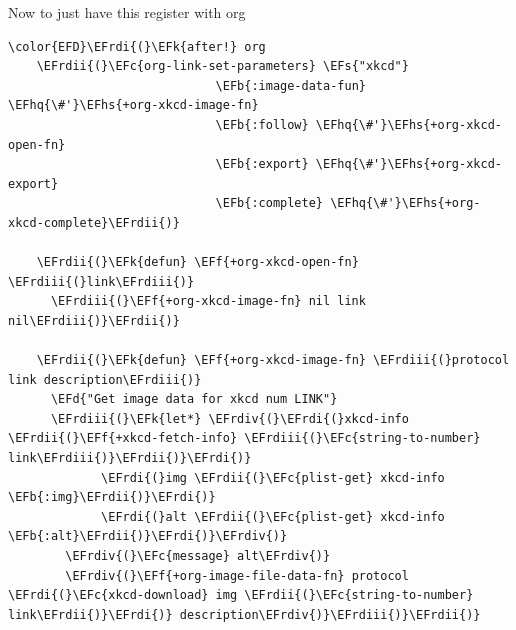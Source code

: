 \documentclass{scrartcl}
\newcommand{\EFk}[1]{\textcolor{EFk}{#1}} %
\newcommand{\EFd}[1]{\textcolor{EFd}{\textit{#1}}} %
\newcommand{\EFs}[1]{\textcolor{EFs}{#1}} %
\newcommand{\EFb}[1]{\textcolor{EFb}{#1}} %
\newcommand{\EFc}[1]{\textcolor{EFc}{#1}} %
\newcommand{\EFf}[1]{\textcolor{EFf}{#1}} %
\newcommand{\EFhq}[1]{\textcolor{EFhq}{#1}} %
\newcommand{\EFhs}[1]{\textcolor{EFhs}{#1}} %
\newcommand{\EFrdi}[1]{\textcolor{EFrdi}{#1}} %
\newcommand{\EFrdii}[1]{\textcolor{EFrdii}{#1}} %
\newcommand{\EFrdiii}[1]{\textcolor{EFrdiii}{#1}} %
\newcommand{\EFrdiv}[1]{\textcolor{EFrdiv}{#1}} %
\begin{document}
Now to just have this register with org
\begin{Code}
\begin{Verbatim}[]
\color{EFD}\EFrdi{(}\EFk{after!} org
	\EFrdii{(}\EFc{org-link-set-parameters} \EFs{"xkcd"}
	                         \EFb{:image-data-fun} \EFhq{\#'}\EFhs{+org-xkcd-image-fn}
	                         \EFb{:follow} \EFhq{\#'}\EFhs{+org-xkcd-open-fn}
	                         \EFb{:export} \EFhq{\#'}\EFhs{+org-xkcd-export}
	                         \EFb{:complete} \EFhq{\#'}\EFhs{+org-xkcd-complete}\EFrdii{)}
	
	\EFrdii{(}\EFk{defun} \EFf{+org-xkcd-open-fn} \EFrdiii{(}link\EFrdiii{)}
	  \EFrdiii{(}\EFf{+org-xkcd-image-fn} nil link nil\EFrdiii{)}\EFrdii{)}
	
	\EFrdii{(}\EFk{defun} \EFf{+org-xkcd-image-fn} \EFrdiii{(}protocol link description\EFrdiii{)}
	  \EFd{"Get image data for xkcd num LINK"}
	  \EFrdiii{(}\EFk{let*} \EFrdiv{(}\EFrdi{(}xkcd-info \EFrdii{(}\EFf{+xkcd-fetch-info} \EFrdiii{(}\EFc{string-to-number} link\EFrdiii{)}\EFrdii{)}\EFrdi{)}
	         \EFrdi{(}img \EFrdii{(}\EFc{plist-get} xkcd-info \EFb{:img}\EFrdii{)}\EFrdi{)}
	         \EFrdi{(}alt \EFrdii{(}\EFc{plist-get} xkcd-info \EFb{:alt}\EFrdii{)}\EFrdi{)}\EFrdiv{)}
	    \EFrdiv{(}\EFc{message} alt\EFrdiv{)}
	    \EFrdiv{(}\EFf{+org-image-file-data-fn} protocol \EFrdi{(}\EFc{xkcd-download} img \EFrdii{(}\EFc{string-to-number} link\EFrdii{)}\EFrdi{)} description\EFrdiv{)}\EFrdiii{)}\EFrdii{)}
	

\end{Verbatim}
\end{Code}
\end{document}
